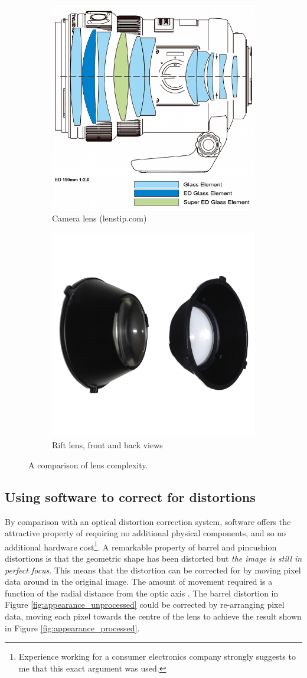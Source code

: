 \documentclass[MSc,paper=a4,pagesize=auto]{icldt}
\begin{document}
\begin{figure}[htbp!]
\centering
\begin{subfigure}{0.5\textwidth}
    \centering
    \includegraphics[width=0.5\linewidth]{resources/camera_lens}
    \caption{Camera lens (lenstip.com)}
	\label{fig:camera_lens}
\end{subfigure}%
\centering
\begin{subfigure}{0.5\textwidth}
    \centering
    \includegraphics[width=0.5\linewidth]{resources/rift_lenses}
    \caption{Rift lens, front and back views}
	\label{fig:rift_lens}
\end{subfigure}    
    \caption{A comparison of lens complexity.}
    \label{fig:lens_comparison}
\end{figure}

\subsection{Using software to correct for distortions}
By comparison with an optical distortion correction system, software offers the attractive property of requiring no additional physical components, and so no additional hardware cost\footnote{Experience working for a consumer electronics company strongly suggests to me that this exact argument was used.}. A remarkable property of barrel and pincushion distortions is that the geometric shape has been distorted but \textit{the image is still in perfect focus}. This means that the distortion can be corrected for by moving pixel data around in the original image. The amount of movement required is a function of the radial distance from the optic axis \cite{Brunelli2009}. The barrel distortion in Figure \ref{fig:appearance_unprocessed} could be corrected by re-arranging pixel data, moving each pixel towards the centre of the lens to achieve the result shown in Figure \ref{fig:appearance_processed}.
\end{document}
